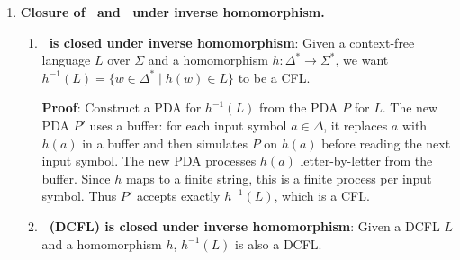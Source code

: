 \begin{enumerate}[{10.}1. ]
\begin{enumerate}
\item \textbf{PDA via empty stack}: Pop $Z$ as well. Add $\delta(q,\lambda,Z)=\langle q,\lambda\rangle$ (the stack becomes empty when balanced).

\item \textbf{Counting automaton}: No. The counts $|x|_{\pmb{a}}+|x|_{\pmb{b}}$ and $|x|_{\pmb{c}}$ can be unbounded.

\item \textbf{DPDA}: Yes. The two-symbol construction in part~(a) is deterministic: for each $(q, \sigma, X)$ triple there is at most one transition, since every input symbol and every stack top symbol determine a unique action. The only potential conflict is the $\lambda$-transition $\delta(q,\lambda,Z)=\langle f,Z\rangle$, which must not coexist with other $q$-transitions on $Z$. This is resolved by moving the $\lambda$-acceptance to a separate final state reached only when input is exhausted; in practice, the construction is deterministic for all reachable configurations. Hence a DPDA for $L$ exists.

\item \textbf{Grammar from PDA}: Apply Definition 10.7 to the PDA in part (a) to derive the context-free grammar.
\end{enumerate}

\item \textbf{Closure of \PSIG\ and \ASIG\ under inverse homomorphism.}

\begin{enumerate}
\item \textbf{\PSIG\ is closed under inverse homomorphism}: Given a context-free language $L$ over $\Sigma$ and a homomorphism $h: \Delta^* \to \Sigma^*$, we want $h^{-1}(L) = \{w \in \Delta^* \mid h(w) \in L\}$ to be a CFL.

\textbf{Proof}: Construct a PDA for $h^{-1}(L)$ from the PDA $P$ for $L$. The new PDA $P'$ uses a buffer: for each input symbol $a\in\Delta$, it replaces $a$ with $h(a)$ in a buffer and then simulates $P$ on $h(a)$ before reading the next input symbol. The new PDA processes $h(a)$ letter-by-letter from the buffer. Since $h$ maps to a finite string, this is a finite process per input symbol. Thus $P'$ accepts exactly $h^{-1}(L)$, which is a CFL.

\item \textbf{\ASIG\ (DCFL) is closed under inverse homomorphism}: Given a DCFL $L$ and a homomorphism $h$, $h^{-1}(L)$ is also a DCFL.


\end{enumerate}
\end{enumerate}

